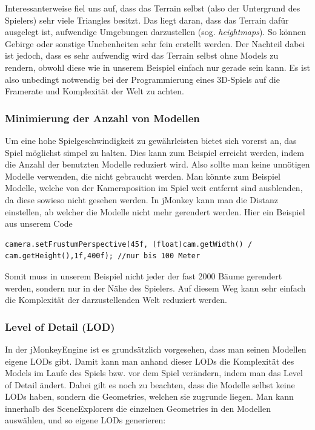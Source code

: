 Interessanterweise fiel uns auf, dass das Terrain selbst (also der Untergrund des Spielers) sehr viele Triangles besitzt. Das liegt daran, dass das Terrain dafür ausgelegt ist, aufwendige Umgebungen darzustellen (sog. \emph{heightmaps}). So können Gebirge oder sonstige Unebenheiten sehr fein erstellt werden. Der Nachteil dabei ist jedoch, dass es sehr aufwendig wird das Terrain selbst ohne Models zu rendern, obwohl diese wie in unserem Beispiel einfach nur gerade sein kann. Es ist also unbedingt notwendig bei der Programmierung eines 3D-Spiels auf die Framerate und Komplexität der Welt zu achten.



\subsubsection{Minimierung der Anzahl von Modellen}
Um eine hohe Spielgeschwindigkeit zu gewährleisten bietet sich vorerst an, das Spiel möglichst simpel zu halten. Dies kann zum Beispiel erreicht werden, indem die Anzahl der benutzten Modelle reduziert wird. Also sollte man keine unnötigen Modelle verwenden, die nicht gebraucht werden. Man könnte zum Beispiel Modelle, welche von der Kameraposition im Spiel weit entfernt sind ausblenden, da diese sowieso nicht gesehen werden. In jMonkey kann man die Distanz einstellen, ab welcher die Modelle nicht mehr gerendert werden. Hier ein Beispiel aus unserem Code


\begin{lstlisting}
camera.setFrustumPerspective(45f, (float)cam.getWidth() / cam.getHeight(),1f,400f); //nur bis 100 Meter
\end{lstlisting}


Somit muss in unserem Beispiel nicht jeder der fast 2000 Bäume gerendert werden, sondern nur in der Nähe des Spielers. Auf diesem Weg kann sehr einfach die Komplexität der darzustellenden Welt reduziert werden.

\subsubsection{Level of Detail (LOD)}
In der jMonkeyEngine ist es grundsätzlich vorgesehen, dass man seinen Modellen eigene LODs gibt. Damit kann man anhand dieser LODs die Komplexität des Models im Laufe des Spiels bzw. vor dem Spiel verändern, indem man das Level of Detail ändert. Dabei gilt es noch zu beachten, dass die Modelle selbst keine LODs haben, sondern die Geometries, welchen sie zugrunde liegen. Man kann innerhalb des SceneExplorers die einzelnen Geometries in den Modellen auswählen, und so eigene LODs generieren:

